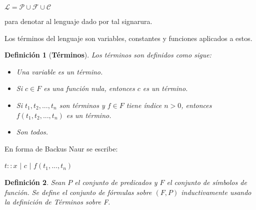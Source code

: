 \documentclass[letterpaper,11pt]{article}
\newtheorem{teo}{Definición}[]
\begin{document}
\begin{enumerate}
\begin{itemize}
\begin{itemize}
                \begin{center}
                    $\mathcal{L} = \mathcal{P} \cup \mathcal{F} \cup \mathcal{C}$
                \end{center}

                para denotar al lenguaje dado por tal signarura.
            \end{itemize}

            Los términos del lenguaje son variables, constantes y funciones aplicados
            a estos.
            
            \begin{teo}[\textbf{Términos}]
                Los términos son definidos como sigue:
                
                \begin{itemize}
                    \item Una variable es un término.
                    \item Si $c \in F$ es una función nula, entonces $c$ es un término.
                    \item Si $t_{1}, t_{2}, ..., t_{n}$ son términos y $f \in F$ tiene
                    índice $n > 0$, entonces $f(t_{1}, t_{2}, ..., t_{n})$ es un término.
                    \item Son todos.
                \end{itemize}
            \end{teo}

            En forma de Backus Naur se escribe:
            
            \begin{center}
                $t :: x$ $|$ $c$ $|$ $f(t_{1},...,t_{n})$
            \end{center}

            \begin{teo}
                Sean $P$ el conjunto de predicados y $F$ el conjunto de símbolos de 
                función. Se define el conjunto de fórmulas sobre $(F, P)$
                inductivamente usando la definición de Términos sobre F.
                

\end{teo}
\end{itemize}
\end{enumerate}
\end{document}
